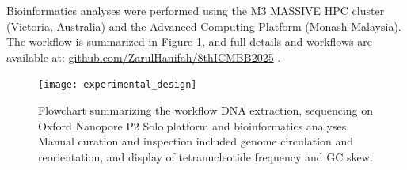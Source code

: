 Bioinformatics analyses were performed using the M3 MASSIVE HPC cluster (Victoria, Australia) and the Advanced Computing Platform (Monash Malaysia). The workflow is summarized in Figure \ref{fig:workflow}, and full details and workflows are available at: \url{github.com/ZarulHanifah/8thICMBB2025} \cite{Kolmogorov_2019_flye, Alneberg_2014_concoct, Pan_2022_semibin, Mallawaarachchi_2022_metacoag, Shaffer_2020_dram}.

\begin{figure}[H]
    \vspace{-0.4cm}
    \centering
    \texttt{[image: experimental\_design]}
    \caption{\scriptsize Flowchart summarizing the workflow DNA extraction, sequencing on Oxford Nanopore P2 Solo platform and bioinformatics analyses. Manual curation and inspection included genome circulation and reorientation, and display of tetranucleotide frequency and GC skew.}
    \label{fig:workflow}
\end{figure}

